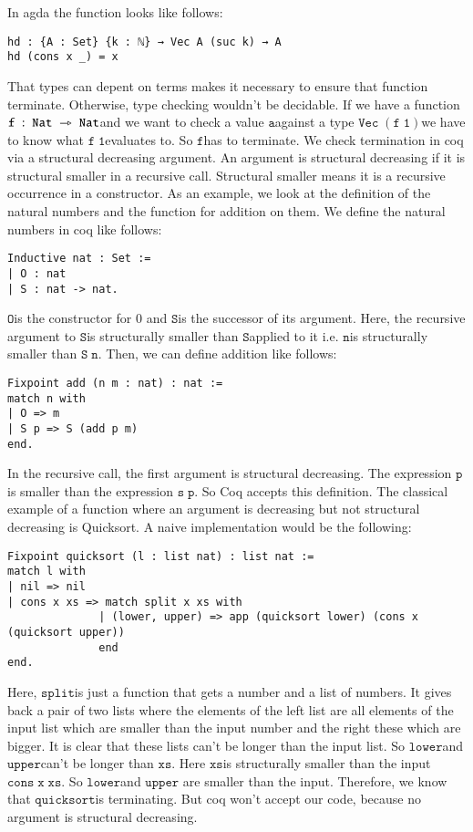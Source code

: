 \documentclass[a4paper,cleardoubleempty,BCOR1cm]{scrbook}
\begin{document}
In agda the function looks like follows:
\begin{verbatim}
hd : {A : Set} {k : ℕ} → Vec A (suc k) → A
hd (cons x _) = x
\end{verbatim}
That types can depent on terms makes it necessary to ensure that function
\linebreak terminate. Otherwise, type checking wouldn't be decidable. If we have a
function \linebreak $\mathtt{f\;:\;Nat\;\rightarrowtriangle\;Nat}$\;and we want to check a value $\mathtt{a}$\;against a type
$\mathtt{Vec\;(f\;1)}$\;we have to know what $\mathtt{f\;1}$\;evaluates to. So $\mathtt{f}$\;has to terminate.
We check termination in coq via a structural decreasing argument. An argument
is structural decreasing if it is structural smaller in a recursive call.
Structural smaller means it is a recursive occurrence in a constructor. As an
example, we look at the definition of the natural numbers and the function for addition
on them. We define the natural numbers in coq like follows:
\begin{verbatim}
Inductive nat : Set :=
| O : nat
| S : nat -> nat.
\end{verbatim}
$\mathtt{O}$\;is the constructor for 0 and $\mathtt{S}$\;is the successor of its argument. Here,
the recursive argument to $\mathtt{S}$\;is structurally smaller than $\mathtt{S}$\;applied to it i.e.
$\mathtt{n}$\;is structurally smaller than $\mathtt{S\;n}$. Then, we can define addition like follows:
\begin{verbatim}
Fixpoint add (n m : nat) : nat :=
match n with
| O => m
| S p => S (add p m)
end.
\end{verbatim}
In the recursive call, the first argument is structural decreasing. The
expression $\mathtt{p}$\;is smaller than the expression $\mathtt{s\;p}$. So Coq accepts this
definition. The classical example of a function where an argument is
decreasing but not structural decreasing is Quicksort. A naive implementation
would be the following:
\begin{verbatim}
Fixpoint quicksort (l : list nat) : list nat :=
match l with
| nil => nil
| cons x xs => match split x xs with
              | (lower, upper) => app (quicksort lower) (cons x (quicksort upper))
              end
end.
\end{verbatim}
Here, $\mathtt{split}$\;is just a function that gets a number and a list of numbers. It
gives back a pair of two lists where the elements of the left list are all
elements of the input list which are smaller than the input number and the
right these which are bigger. It is clear that these lists can't be longer
than the input list. So $\mathtt{lower}$\;and $\mathtt{upper}$\;can't be longer than $\mathtt{xs}$. Here
$\mathtt{xs}$\;is structurally smaller than the input $\mathtt{cons\;x\;xs}$. So $\mathtt{lower}$\;and $\mathtt{upper}$
are smaller than the input. Therefore, we know that $\mathtt{quicksort}$\;is terminating.
But coq won't accept our code, because no argument is structural decreasing.
\end{document}
